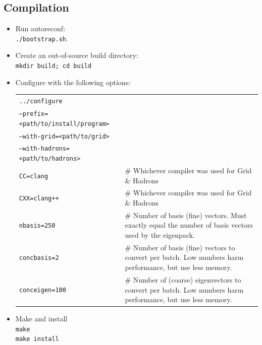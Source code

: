 \documentclass{article}
\begin{document}
\subsection{Compilation}
\begin{itemize}
\item Run autoreconf:\\
\texttt{./bootstrap.sh}.
\item Create an out-of-source build directory:\\
\texttt{mkdir build; cd build}
\item Configure with the following options:\\
\begin{tabular}{p{}p{}}
\texttt{../configure} &\\
\texttt{--prefix=<path/to/install/program>}&\\
\texttt{--with-grid=<path/to/grid>}&\\
\texttt{--with-hadrons=<path/to/hadrons>}&\\
\texttt{CC=clang}       & \# Whichever compiler was used for Grid \& Hadrons\\
\texttt{CXX=clang++}    & \# Whichever compiler was used for Grid \& Hadrons\\
\texttt{nbasis=250}   & \# Number of basis (fine) vectors. Must exactly equal the number of basis vectors used by the eigenpack.\\
\texttt{concbasis=2}  & \# Number of basis (fine) vectors to convert per batch. Low numbers harm performance, but use less memory.\\
\texttt{conceigen=100}& \# Number of (coarse) eigenvectors to convert per batch. Low numbers harm performance, but use less memory.
\end{tabular}
\item Make and install\\
\texttt{make}\\
\texttt{make install}
\end{itemize}
\end{document}
